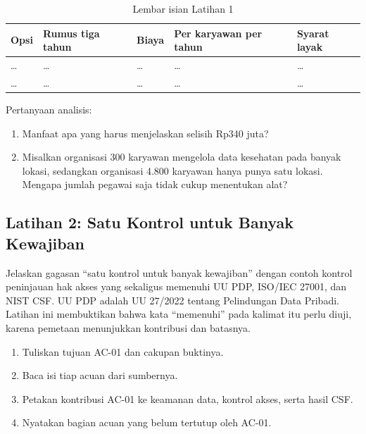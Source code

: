 \begin{table}[!htb]
  \centering\small
  \caption{Lembar isian Latihan 1}\label{tab:ch14-lat1-hasil}
  \begin{tabularx}{\textwidth}{|>{\raggedright\arraybackslash}p{}|>{\raggedright\arraybackslash}X|>{\raggedright\arraybackslash}p{}|>{\raggedright\arraybackslash}X|>{\raggedright\arraybackslash}X|}
    \hline
    \textbf{Opsi} & \textbf{Rumus tiga tahun} & \textbf{Biaya} & \textbf{Per karyawan per tahun} &
    \textbf{Syarat layak} \\ \hline
    \dots & \dots & \dots & \dots & \dots \\ \hline
    \dots & \dots & \dots & \dots & \dots \\ \hline
  \end{tabularx}
\end{table}

Pertanyaan analisis:
\begin{enumerate}
  \item Manfaat apa yang harus menjelaskan selisih Rp340 juta?
  \item Misalkan organisasi 300 karyawan mengelola data kesehatan pada banyak lokasi, sedangkan
  organisasi 4.800 karyawan hanya punya satu lokasi. Mengapa jumlah pegawai saja tidak cukup
  menentukan alat?
\end{enumerate}

\subsection*{Latihan 2: Satu Kontrol untuk Banyak Kewajiban}

Jelaskan gagasan ``satu kontrol untuk banyak kewajiban'' dengan contoh kontrol peninjauan hak akses
yang sekaligus memenuhi UU PDP, ISO/IEC 27001, dan NIST CSF. UU PDP adalah UU 27/2022 tentang
Pelindungan Data Pribadi. Latihan ini membuktikan bahwa kata ``memenuhi'' pada kalimat itu perlu
diuji, karena pemetaan menunjukkan kontribusi dan batasnya.
\begin{enumerate}
  \item Tuliskan tujuan AC-01 dan cakupan buktinya.
  \item Baca isi tiap acuan dari sumbernya.
  \item Petakan kontribusi AC-01 ke keamanan data, kontrol akses, serta hasil CSF.
  \item Nyatakan bagian acuan yang belum tertutup oleh AC-01.
\end{enumerate}

